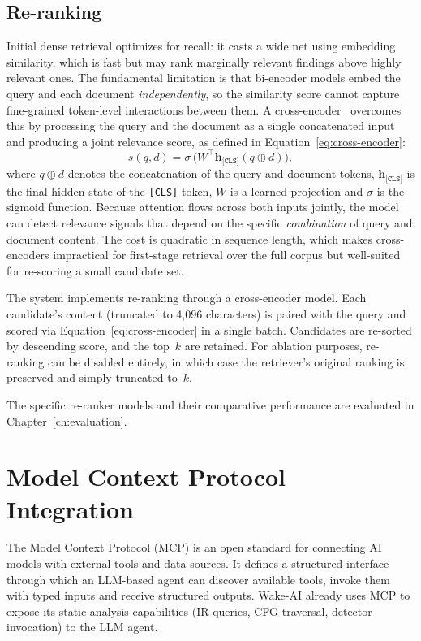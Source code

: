 \subsection{Re-ranking}
\label{subsec:reranking}

Initial dense retrieval optimizes for recall: it casts a wide net using embedding similarity, which is fast but may rank marginally relevant findings above highly relevant ones. The fundamental limitation is that bi-encoder models embed the query and each document \emph{independently}, so the similarity score cannot capture fine-grained token-level interactions between them. A cross-encoder~\cite{nogueira2019passage} overcomes this by processing the query and the document as a single concatenated input and producing a joint relevance score, as defined in Equation~\ref{eq:cross-encoder}:
%
\begin{equation}
    s(q, d) = \sigma\,\bigl(W^\top \mathbf{h}_{\texttt{[CLS]}}(q \oplus d)\bigr),
    \label{eq:cross-encoder}
\end{equation}
%
where $q \oplus d$ denotes the concatenation of the query and document tokens, $\mathbf{h}_{\texttt{[CLS]}}$ is the final hidden state of the \texttt{[CLS]} token, $W$ is a learned projection and $\sigma$ is the sigmoid function. Because attention flows across both inputs jointly, the model can detect relevance signals that depend on the specific \emph{combination} of query and document content. The cost is quadratic in sequence length, which makes cross-encoders impractical for first-stage retrieval over the full corpus but well-suited for re-scoring a small candidate set.

The system implements re-ranking through a cross-encoder model. Each candidate's content (truncated to 4{,}096 characters) is paired with the query and scored via Equation~\ref{eq:cross-encoder} in a single batch. Candidates are re-sorted by descending score, and the top~$k$ are retained. For ablation purposes, re-ranking can be disabled entirely, in which case the retriever's original ranking is preserved and simply truncated to~$k$.

The specific re-ranker models and their comparative performance are evaluated in Chapter~\ref{ch:evaluation}.

\section{Model Context Protocol Integration}
\label{sec:mcp-integration}

The Model Context Protocol (MCP) is an open standard for connecting AI models with external tools and data sources. It defines a structured interface through which an LLM-based agent can discover available tools, invoke them with typed inputs and receive structured outputs. Wake-AI already uses MCP to expose its static-analysis capabilities (IR queries, CFG traversal, detector invocation) to the LLM agent.

